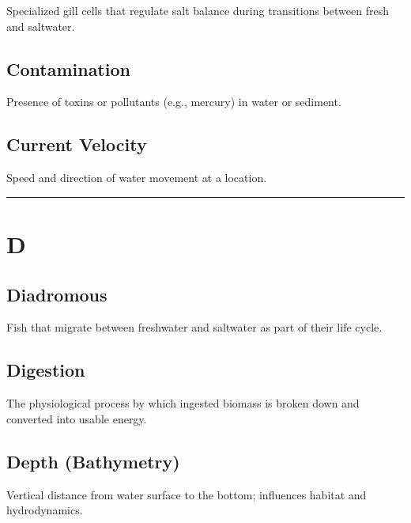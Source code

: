 \documentclass[
]{book}
\begin{document}
Specialized gill cells that regulate salt balance during transitions between fresh and saltwater.

\subsection{\texorpdfstring{\textbf{Contamination}}{Contamination}}\label{contamination}

Presence of toxins or pollutants (e.g., mercury) in water or sediment.

\subsection{\texorpdfstring{\textbf{Current Velocity}}{Current Velocity}}\label{current-velocity}

Speed and direction of water movement at a location.

\begin{center}\rule{0.5\linewidth}{0.5pt}\end{center}

\section*{D}\label{d}

\subsection{\texorpdfstring{\textbf{Diadromous}}{Diadromous}}\label{diadromous}

Fish that migrate between freshwater and saltwater as part of their life cycle.

\subsection{\texorpdfstring{\textbf{Digestion}}{Digestion}}\label{digestion-1}

The physiological process by which ingested biomass is broken down and converted into usable energy.

\subsection{\texorpdfstring{\textbf{Depth (Bathymetry)}}{Depth (Bathymetry)}}\label{depth-bathymetry}

Vertical distance from water surface to the bottom; influences habitat and hydrodynamics.
\end{document}
